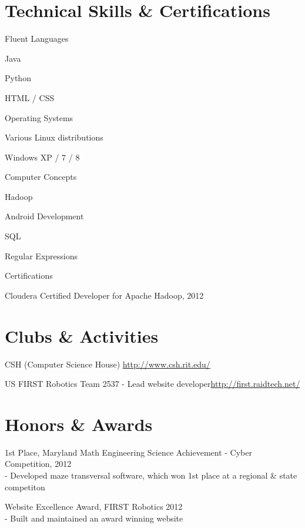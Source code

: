 \documentclass[a4paper,margin,line,11pt]{resume}
\newcommand{\rurl}[1]{\hfill {\footnotesize \url{#1}}}
\begin{document}
\begin{resume}
\section{\mysidestyle Technical Skills \& Certifications}
	\begin{compactdesc}
		\item[Fluent Languages] \begin{inparaenum} { \small
			\item Java
			\item Python
			\item HTML / CSS
		} \end{inparaenum}
		\item[Operating Systems] \begin{inparaenum} { \small
			\item Various Linux distributions
			\item Windows XP / 7 / 8
		} \end{inparaenum}
		\item[Computer Concepts] \begin{inparaenum} { \small
			\item Hadoop
			\item Android Development
			\item SQL
			\item Regular Expressions
		} \end{inparaenum}
		\item[Certifications] \begin{inparaenum} { \small
			\item Cloudera Certified Developer for Apache Hadoop, 2012
		} \end{inparaenum}
	\end{compactdesc}

\section{\mysidestyle Clubs \& Activities}
	\begin{asparablank}
		\item CSH ({\small Computer Science House}) \rurl{http://www.csh.rit.edu/}
		\item US FIRST Robotics Team 2537 - {\small Lead website developer}\rurl{http://first.raidtech.net/}
	\end{asparablank}

\section{\mysidestyle Honors \& Awards}
	\begin{asparablank}
		\item 1st Place, Maryland Math Engineering Science Achievement - Cyber Competition, 2012
		\\ - Developed maze transversal software, which won 1st place at a regional \& state competiton
		\item Website Excellence Award, FIRST Robotics 2012
		\\ - Built and maintained an award winning website 
	\end{asparablank}

\end{resume}
\end{document}
